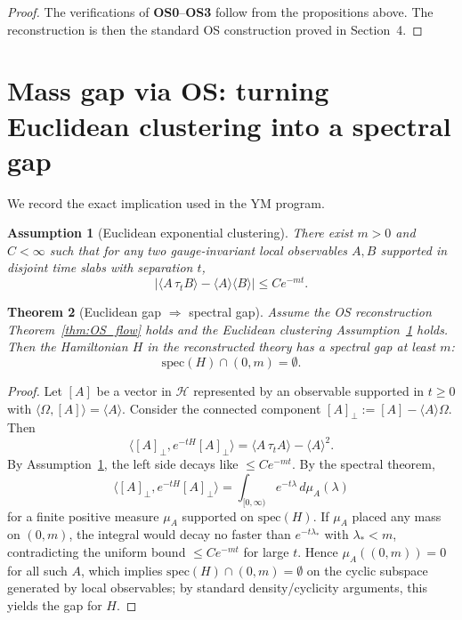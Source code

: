 \documentclass[11pt]{article}
\newtheorem{theorem}{Theorem}[section]
\newtheorem{assumption}[theorem]{Assumption}
\theoremstyle{definition}
\newcommand{\1}{\mathbf{1}}
\newcommand{\ip}[2]{\langle #1,#2\rangle}
\newcommand{\cH}{\mathcal{H}}
\begin{document}
\begin{proof}
The verifications of \textbf{OS0}--\textbf{OS3} follow from the propositions above. The reconstruction is then the standard OS construction proved in Section~4.
\end{proof}

\section{Mass gap via OS: turning Euclidean clustering into a spectral gap}

We record the exact implication used in the YM program.

\begin{assumption}[Euclidean exponential clustering]\label{ass:cluster}
There exist \(m>0\) and \(C<\infty\) such that for any two gauge-invariant local observables \(A,B\) supported in disjoint time slabs with separation \(t\),
\[
\big|\langle A\,\tau_t B\rangle - \langle A\rangle\langle B\rangle\big| \le C e^{-mt}.
\]
\end{assumption}

\begin{theorem}[Euclidean gap \(\Rightarrow\) spectral gap]
Assume the OS reconstruction Theorem~\ref{thm:OS_flow} holds and the Euclidean clustering Assumption~\ref{ass:cluster} holds. Then the Hamiltonian \(H\) in the reconstructed theory has a spectral gap at least \(m\):
\[
\mathrm{spec}(H)\cap (0,m)=\emptyset.
\]
\end{theorem}

\begin{proof}
Let \([A]\) be a vector in \(\cH\) represented by an observable supported in \(t\ge 0\) with \(\ip{\Omega}{[A]}=\langle A\rangle\). Consider the connected component \([A]_\perp := [A]-\langle A\rangle\Omega\). Then
\[
\ip{[A]_\perp}{e^{-tH}[A]_\perp} = \langle A\,\tau_t A\rangle - \langle A\rangle^2.
\]
By Assumption~\ref{ass:cluster}, the left side decays like \(\le C e^{-mt}\). By the spectral theorem,
\[
\ip{[A]_\perp}{e^{-tH}[A]_\perp} = \int_{[0,\infty)} e^{-t\lambda}\, d\mu_A(\lambda)
\]
for a finite positive measure \(\mu_A\) supported on \(\mathrm{spec}(H)\). If \(\mu_A\) placed any mass on \((0,m)\), the integral would decay no faster than \(e^{-t\lambda_*}\) with \(\lambda_*<m\), contradicting the uniform bound \(\le C e^{-mt}\) for large \(t\). Hence \(\mu_A((0,m))=0\) for all such \(A\), which implies \(\mathrm{spec}(H)\cap(0,m)=\emptyset\) on the cyclic subspace generated by local observables; by standard density/cyclicity arguments, this yields the gap for \(H\).
\end{proof}
\end{document}
